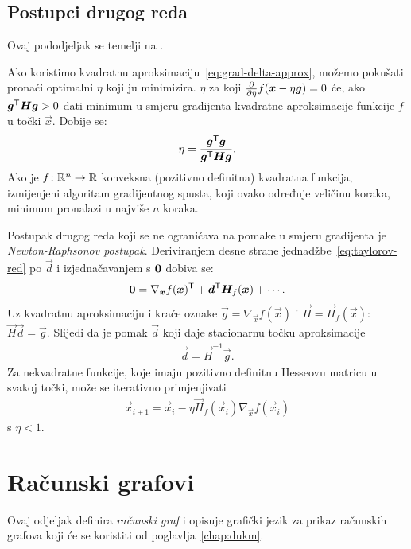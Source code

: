 \documentclass[utf8, diplomski, lmodern]{fer}
\begin{document}
\subsection{Postupci drugog reda}

Ovaj pododjeljak se temelji na \citet{Goodfellow:2016:DL}.

Ako koristimo kvadratnu aproksimaciju~\eqref{eq:grad-delta-approx}, možemo pokušati pronaći optimalni $\eta$ koji ju minimizira. $\eta$ za koji $\pd{}{\eta}f(\vec x-\eta\vec g)=0$ će, ako $\vec g^\tp\vec H\vec g>0$ dati minimum u smjeru gradijenta kvadratne aproksimacije funkcije $f$ u točki $\vec x$. Dobije se:
\begin{align}
\eta = \frac{\vec g^\tp \vec g}{\vec g^\tp\vec H\vec g} \text{.}
\end{align}
Ako je $f \colon \mathbb{R}^n \to \mathbb{R}$ konveksna (pozitivno definitna) kvadratna funkcija, izmijenjeni algoritam gradijentnog spusta, koji ovako određuje veličinu koraka, minimum pronalazi u najviše $n$ koraka. 

Postupak drugog reda koji se ne ograničava na pomake u smjeru gradijenta je \emph{Newton-Raphsonov postupak}. Deriviranjem desne strane jednadžbe~\eqref{eq:taylorov-red} po $\vec d$ i izjednačavanjem s $\mathbf{0}$ dobiva se:
\begin{align}
\cvec 0 = \nabla_{\vec x}f(\vec x)^\tp + \vec d^\tp\vec H_f(\vec x) + \cdots \text{.}
\end{align}
Uz kvadratnu aproksimaciju i kraće oznake $\vec g=\nabla_{\vec x}f(\vec x)$ i $\vec H=\vec H_f(\vec x)$: $\vec H\vec d = \vec g$. Slijedi da je pomak $\vec d$ koji daje stacionarnu točku aproksimacije
\begin{align}
\vec d = \vec H^{-1}\vec g \text{.}
\end{align}
Za nekvadratne funkcije, koje imaju pozitivno definitnu Hesseovu matricu u svakoj točki, može se iterativno primjenjivati
\begin{align}
\vec x_{i+1} = \vec x_i - \eta\vec H_f(\vec x_i)\nabla_{\vec x}f(\vec x_i)
\end{align}
s $\eta<1$.


\iffalse
\section{Računski grafovi}

Ovaj odjeljak definira \emph{računski graf} i opisuje grafički jezik za prikaz računskih grafova koji će se koristiti od poglavlja~\ref{chap:dukm}.
\end{document}
